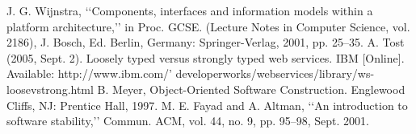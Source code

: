 \documentclass[letterpaper, 10 pt, conference]{ieeeconf}
\begin{document}
\begin{thebibliography}{}
 J. G. Wijnstra, ‘‘Components, interfaces and information models within a platform architecture,’’ in Proc. GCSE. (Lecture Notes in Computer Science, vol. 2186), J. Bosch, Ed. Berlin, Germany: Springer-Verlag, 2001, pp. 25–35.
 A. Tost (2005, Sept. 2). Loosely typed versus strongly typed web services. IBM [Online]. Available: http://www.ibm.com/’ developerworks/webservices/library/ws-loosevstrong.html
 B. Meyer, Object-Oriented Software Construction. Englewood Cliffs, NJ: Prentice Hall, 1997.
 M. E. Fayad and A. Altman, ‘‘An introduction to software stability,’’ Commun. ACM, vol. 44, no. 9, pp. 95–98, Sept. 2001.

\end{thebibliography}
\end{document}
